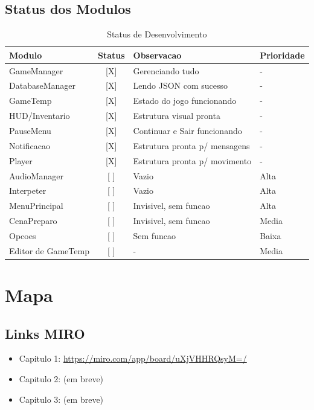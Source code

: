 \documentclass[12pt]{article}
\begin{document}
\subsection{Status dos Modulos}

\begin{table}[h]
\centering
\small
\begin{tabular}{|l|c|p{5cm}|p{2.5cm}|}
\hline
\textbf{Modulo} & \textbf{Status} & \textbf{Observacao} & \textbf{Prioridade} \\
\hline
GameManager & [X] & Gerenciando tudo & - \\
DatabaseManager & [X] & Lendo JSON com sucesso & - \\
GameTemp & [X] & Estado do jogo funcionando & - \\
HUD/Inventario & [X] & Estrutura visual pronta & - \\
PauseMenu & [X] & Continuar e Sair funcionando & - \\
Notificacao & [X] & Estrutura pronta p/ mensagens & - \\
Player & [X] & Estrutura pronta p/ movimento & - \\
\hline
AudioManager & [ ] & Vazio & Alta \\
Interpeter & [ ] & Vazio & Alta \\
MenuPrincipal & [ ] & Invisivel, sem funcao & Alta \\
CenaPreparo & [ ] & Invisivel, sem funcao & Media \\
Opcoes & [ ] & Sem funcao & Baixa \\
Editor de GameTemp & [ ] & - & Media \\
\hline
\end{tabular}
\caption{Status de Desenvolvimento}
\end{table}

\newpage

\section{Mapa}

\subsection{Links MIRO}

\begin{itemize}
    \item Capitulo 1: \url{https://miro.com/app/board/uXjVHHRQsyM=/}
    \item Capitulo 2: (em breve)
    \item Capitulo 3: (em breve)
\end{itemize}
\end{document}
